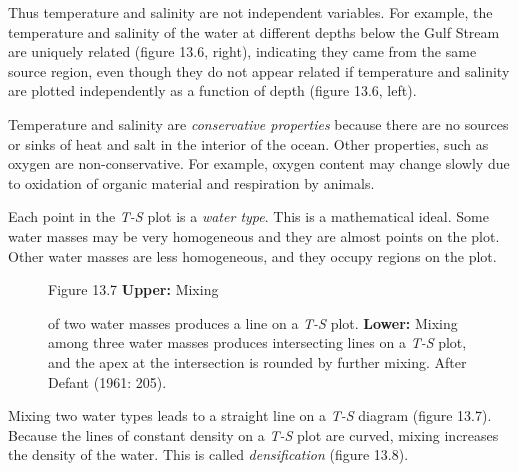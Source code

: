Thus temperature and salinity are not independent variables. For
example, the temperature and salinity of the water at different depths
below the Gulf Stream are uniquely
related (figure 13.6, right), indicating they came from the same
source region, even though they do not appear related if temperature
and salinity are plotted independently as a function of depth (figure
13.6, left).

Temperature and
salinity are \textit{conservative
  properties} because there are
no sources or sinks of heat and salt in the interior of the
ocean. Other properties, such as oxygen are non-conservative. For
example, oxygen content may change slowly due to oxidation of organic
material and respiration by animals.

Each point in the \textit{T-S} plot is a \textit{water
  type}. This is a
mathematical ideal. Some water masses may be very homogeneous and they
are almost points on the plot. Other water masses are less
homogeneous, and they occupy regions on the plot.

\begin{figure}[t!]
\footnotesize
Figure 13.7 \textbf{Upper:} Mixing \rule{0mm}{3ex}of two water masses
produces a line on a \textit{T-S} plot. \textbf{Lower:} Mixing among
three water masses produces intersecting lines on a \textit{T-S} plot,
and the apex at the intersection is rounded by further
mixing. After Defant (1961: 205).
\label{fig:TSsketch}
\vspace{-3ex}
\end{figure}

Mixing two water types leads to a straight
line on a \textit{T-S} diagram (figure 13.7). Because the lines of
constant density on a \textit{T-S} plot are curved,
mixing increases the density of the
water. This is called
\textit{densification} (figure 13.8).

